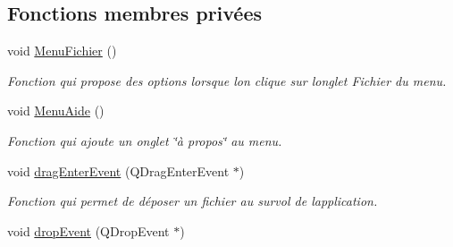 \subsection*{Fonctions membres privées}
\begin{DoxyCompactItemize}
\item 
void \hyperlink{class_main_window_ace494e8ee2d76a6dbd390dc48b9c986c}{Menu\+Fichier} ()
\begin{DoxyCompactList}\small\item\em Fonction qui propose des options lorsque l\textquotesingle{}on clique sur l\textquotesingle{}onglet Fichier du menu. \end{DoxyCompactList}\item 
void \hyperlink{class_main_window_aca604490b4fa5077638a5245bee9e706}{Menu\+Aide} ()
\begin{DoxyCompactList}\small\item\em Fonction qui ajoute un onglet \char`\"{}à propos\char`\"{} au menu. \end{DoxyCompactList}\item 
void \hyperlink{class_main_window_ada907d7d00283f37f6876e28f5a7874e}{drag\+Enter\+Event} (Q\+Drag\+Enter\+Event $\ast$)
\begin{DoxyCompactList}\small\item\em Fonction qui permet de déposer un fichier au survol de l\textquotesingle{}application. \end{DoxyCompactList}\item 
void \hyperlink{class_main_window_a98b2946862365ec3a20677e67a938ea0}{drop\+Event} (Q\+Drop\+Event $\ast$)
\end{DoxyCompactItemize}
